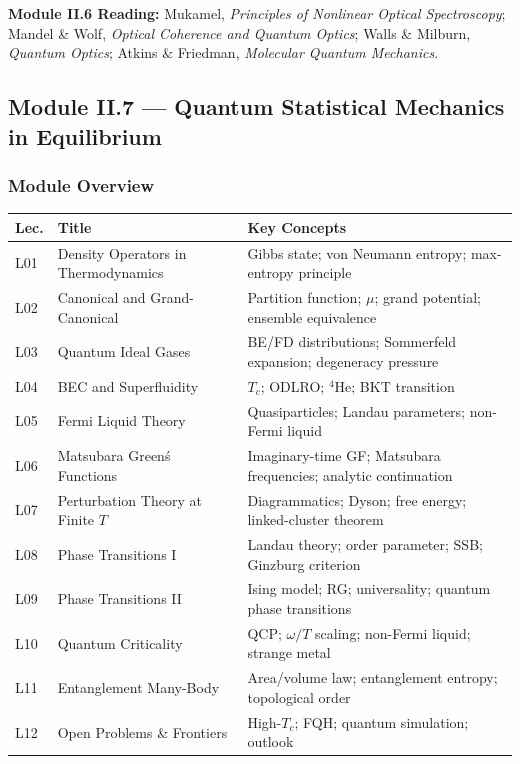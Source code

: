 \documentclass[11pt,a4paper]{article}
\begin{document}
\begin{tcolorbox}[highlightbox]
\textbf{Module II.6 Reading:} Mukamel, \textit{Principles of Nonlinear Optical Spectroscopy}; Mandel \& Wolf, \textit{Optical Coherence and Quantum Optics}; Walls \& Milburn, \textit{Quantum Optics}; Atkins \& Friedman, \textit{Molecular Quantum Mechanics}.
\end{tcolorbox}

\subsection{Module II.7 --- Quantum Statistical Mechanics in Equilibrium}
\label{sec:mod-II7}

\subsubsection*{Module Overview}

{\footnotesize
\begin{center}
\begin{tabular}{@{}lp{4.2cm}p{6.8cm}@{}}
\toprule
\textbf{Lec.} & \textbf{Title} & \textbf{Key Concepts}\\
\midrule
L01 & Density Operators in Thermodynamics & Gibbs state; von Neumann entropy; max-entropy principle\\
L02 & Canonical and Grand-Canonical & Partition function; $\mu$; grand potential; ensemble equivalence\\
L03 & Quantum Ideal Gases & BE/FD distributions; Sommerfeld expansion; degeneracy pressure\\
L04 & BEC and Superfluidity & $T_c$; ODLRO; $^4$He; BKT transition\\
L05 & Fermi Liquid Theory & Quasiparticles; Landau parameters; non-Fermi liquid\\
L06 & Matsubara Green\'s Functions & Imaginary-time GF; Matsubara frequencies; analytic continuation\\
\midrule
L07 & Perturbation Theory at Finite $T$ & Diagrammatics; Dyson; free energy; linked-cluster theorem\\
L08 & Phase Transitions I & Landau theory; order parameter; SSB; Ginzburg criterion\\
L09 & Phase Transitions II & Ising model; RG; universality; quantum phase transitions\\
L10 & Quantum Criticality & QCP; $\omega/T$ scaling; non-Fermi liquid; strange metal\\
L11 & Entanglement Many-Body & Area/volume law; entanglement entropy; topological order\\
L12 & Open Problems \& Frontiers & High-$T_c$; FQH; quantum simulation; outlook\\
\bottomrule
\end{tabular}
\end{center}
}
\end{document}
